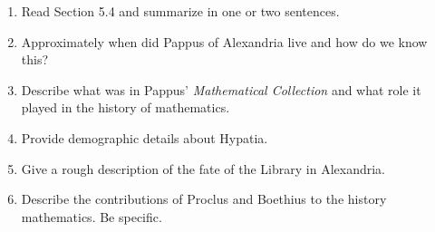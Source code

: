 \documentclass[12pt]{article}
\begin{document}
\begin{enumerate}
\item Read Section 5.4 and summarize in one or two sentences.
\vfill
\item Approximately when did Pappus of Alexandria live and how do we know this?
\vfill
\item Describe what was in Pappus' \textit{Mathematical Collection} and what role it played in the history of mathematics.
\vfill
\item Provide demographic details about Hypatia.
\vfill
\item Give a rough description of the fate of the Library in Alexandria.
\vfill
\item Describe the contributions of Proclus and Boethius to the history mathematics. Be specific.
\vfill
\end{enumerate}
\end{document}
